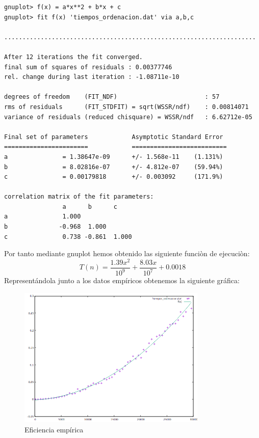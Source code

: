 \documentclass{article}
\begin{document}
\clearpage
\begin{lstlisting}
gnuplot> f(x) = a*x**2 + b*x + c
gnuplot> fit f(x) 'tiempos_ordenacion.dat' via a,b,c

.....................................................................          

After 12 iterations the fit converged.
final sum of squares of residuals : 0.00377746
rel. change during last iteration : -1.08711e-10

degrees of freedom    (FIT_NDF)                        : 57
rms of residuals      (FIT_STDFIT) = sqrt(WSSR/ndf)    : 0.00814071
variance of residuals (reduced chisquare) = WSSR/ndf   : 6.62712e-05

Final set of parameters            Asymptotic Standard Error
=======================            ==========================
a               = 1.38647e-09      +/- 1.568e-11    (1.131%)
b               = 8.02816e-07      +/- 4.812e-07    (59.94%)
c               = 0.00179818       +/- 0.003092     (171.9%)

correlation matrix of the fit parameters:
                a      b      c      
a               1.000 
b              -0.968  1.000 
c               0.738 -0.861  1.000 
\end{lstlisting}
\vspace{10mm}
	Por tanto mediante gnuplot hemos obtenido las siguiente funci\`on de ejecuci\`on:
	\begin{equation}
		T(n) = \frac{1.39x^2}{10^9} + \frac{8.03x}{10^7} + 0.0018
	\end{equation}
	Representándola junto a los datos empíricos obtenemos la siguiente gráfica:
\begin{figure}[H]
  	\caption{Eficiencia emp\'irica}
  	\centering
  		\includegraphics[width=0.8\textwidth]{ejer2/grafica.png}
\end{figure}
\end{document}
